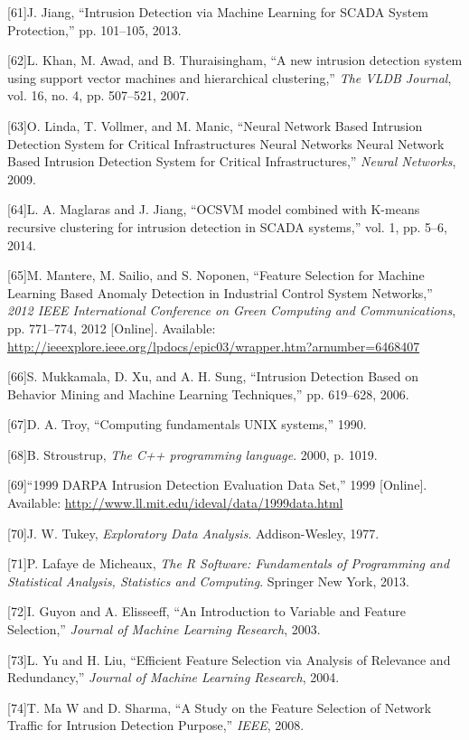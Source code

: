 \documentclass[12pt,]{article}
\begin{document}
{[}61{]}J. Jiang, ``Intrusion Detection via Machine Learning for SCADA
System Protection,'' pp. 101--105, 2013.

{[}62{]}L. Khan, M. Awad, and B. Thuraisingham, ``A new intrusion
detection system using support vector machines and hierarchical
clustering,'' \emph{The VLDB Journal}, vol. 16, no. 4, pp. 507--521,
2007.

{[}63{]}O. Linda, T. Vollmer, and M. Manic, ``Neural Network Based
Intrusion Detection System for Critical Infrastructures Neural Networks
Neural Network Based Intrusion Detection System for Critical
Infrastructures,'' \emph{Neural Networks}, 2009.

{[}64{]}L. A. Maglaras and J. Jiang, ``OCSVM model combined with K-means
recursive clustering for intrusion detection in SCADA systems,'' vol. 1,
pp. 5--6, 2014.

{[}65{]}M. Mantere, M. Sailio, and S. Noponen, ``Feature Selection for
Machine Learning Based Anomaly Detection in Industrial Control System
Networks,'' \emph{2012 IEEE International Conference on Green Computing
and Communications}, pp. 771--774, 2012 {[}Online{]}. Available:
\url{http://ieeexplore.ieee.org/lpdocs/epic03/wrapper.htm?arnumber=6468407}

{[}66{]}S. Mukkamala, D. Xu, and A. H. Sung, ``Intrusion Detection Based
on Behavior Mining and Machine Learning Techniques,'' pp. 619--628,
2006.

{[}67{]}D. A. Troy, ``Computing fundamentals UNIX systems,'' 1990.

{[}68{]}B. Stroustrup, \emph{The C++ programming language}. 2000, p.
1019.

{[}69{]}``1999 DARPA Intrusion Detection Evaluation Data Set,'' 1999
{[}Online{]}. Available:
\url{http://www.ll.mit.edu/ideval/data/1999data.html}

{[}70{]}J. W. Tukey, \emph{Exploratory Data Analysis}. Addison-Wesley,
1977.

{[}71{]}P. Lafaye de Micheaux, \emph{The R Software: Fundamentals of
Programming and Statistical Analysis, Statistics and Computing}.
Springer New York, 2013.

{[}72{]}I. Guyon and A. Elisseeff, ``An Introduction to Variable and
Feature Selection,'' \emph{Journal of Machine Learning Research}, 2003.

{[}73{]}L. Yu and H. Liu, ``Efficient Feature Selection via Analysis of
Relevance and Redundancy,'' \emph{Journal of Machine Learning Research},
2004.

{[}74{]}T. Ma W and D. Sharma, ``A Study on the Feature Selection of
Network Traffic for Intrusion Detection Purpose,'' \emph{IEEE}, 2008.
\end{document}
